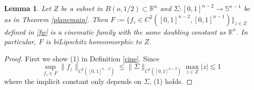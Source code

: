 \documentclass[11pt,a4paper,reqno]{amsart}
\newcommand{\1}{\mathbf{1}}
\numberwithin{equation}{section}
\theoremstyle{plain}
\newtheorem{lemma}[equation]{Lemma}
\theoremstyle{definition}
\theoremstyle{remark}
\begin{document}
\begin{lemma} \label{cineprop}
  Let $Z$ be a subset in $B(o,1/2)\subset \mathbb{R}^{n}$ and $\Sigma : [0,1]^{n-2} \to \mathbb{S}^{n-1}$ be as in Theorem \ref{planemain}. Then  $F:=\{f_{z} \in C^2( [0,1]^{n-2},[0,1]^{n-1})\}_{z \in Z}$ defined in \eqref{fw} is a cinematic family with the same doubling constant as $\mathbb{R}^{n}$. In particular, $F$ is biLipschitz homeomorphic to $Z$.
\end{lemma}

\begin{proof}
First we show (1) in Definition \ref{cine}.
Since
\begin{equation}\label{cine1}
  \sup_{f_{z} \in F }\|f_{z}\|_{C^2([0,1]^{n-2})} \le \|\Sigma\|_{C^2([0,1]^{n-2})} \max_{z \in Z}|z| \lesssim 1
\end{equation}
 where the implicit constant only depends on $\Sigma$, (1) holds.


\end{proof}
\end{document}
